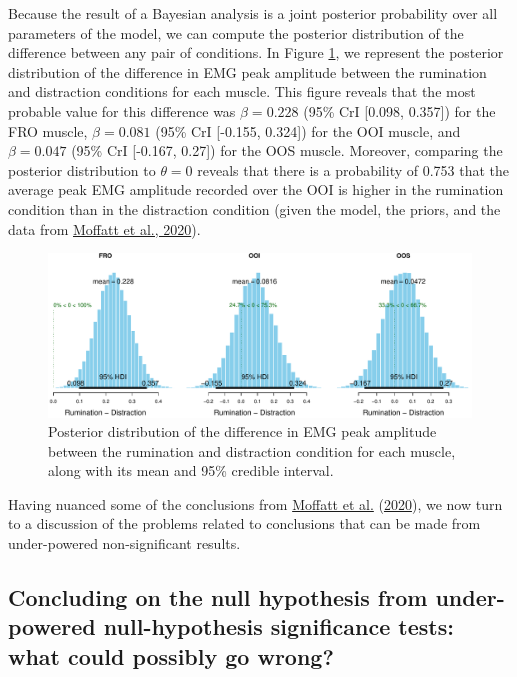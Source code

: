 \documentclass[
  english,
  man, donotrepeattitle,floatsintext]{apa6}
\begin{document}
Because the result of a Bayesian analysis is a joint posterior probability over all parameters of the model, we can compute the posterior distribution of the difference between any pair of conditions. In Figure \ref{fig:posterior}, we represent the posterior distribution of the difference in EMG peak amplitude between the rumination and distraction conditions for each muscle. This figure reveals that the most probable value for this difference was \(\beta = 0.228\) (95\% CrI {[}0.098, 0.357{]}) for the FRO muscle, \(\beta = 0.081\) (95\% CrI {[}-0.155, 0.324{]}) for the OOI muscle, and \(\beta = 0.047\) (95\% CrI {[}-0.167, 0.27{]}) for the OOS muscle. Moreover, comparing the posterior distribution to \(\theta = 0\) reveals that there is a probability of 0.753 that the average peak EMG amplitude recorded over the OOI is higher in the rumination condition than in the distraction condition (given the model, the priors, and the data from \protect\hyperlink{ref-moffatt_inner_2020}{Moffatt et al., 2020}).

\begin{figure}[!htb]

{\centering \includegraphics[width=1\linewidth]{manuscript_files/figure-latex/posterior-1} 

}

\caption{Posterior distribution of the difference in EMG peak amplitude between the rumination and distraction condition for each muscle, along with its mean and 95\% credible interval.}\label{fig:posterior}
\end{figure}

Having nuanced some of the conclusions from \protect\hyperlink{ref-moffatt_inner_2020}{Moffatt et al.} (\protect\hyperlink{ref-moffatt_inner_2020}{2020}), we now turn to a discussion of the problems related to conclusions that can be made from under-powered non-significant results.

\hypertarget{concluding-on-the-null-hypothesis-from-under-powered-null-hypothesis-significance-tests-what-could-possibly-go-wrong}{%
\subsection{Concluding on the null hypothesis from under-powered null-hypothesis significance tests: what could possibly go wrong?}\label{concluding-on-the-null-hypothesis-from-under-powered-null-hypothesis-significance-tests-what-could-possibly-go-wrong}}
\end{document}
